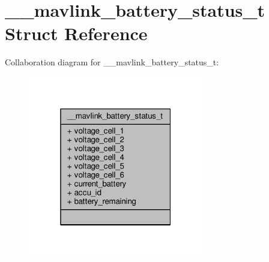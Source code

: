 \hypertarget{struct____mavlink__battery__status__t}{\section{\+\_\+\+\_\+mavlink\+\_\+battery\+\_\+status\+\_\+t Struct Reference}
\label{struct____mavlink__battery__status__t}
}


Collaboration diagram for \+\_\+\+\_\+mavlink\+\_\+battery\+\_\+status\+\_\+t\+:
\nopagebreak
\begin{figure}[H]
\begin{center}
\leavevmode
\includegraphics[width=217pt]{struct____mavlink__battery__status__t__coll__graph}
\end{center}
\end{figure}

